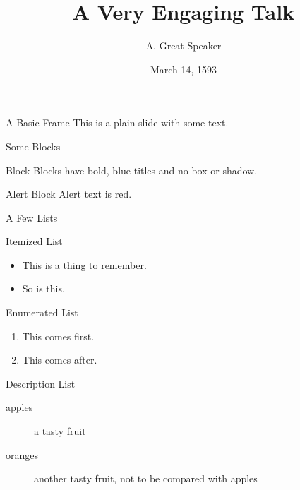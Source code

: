 \documentclass[presentation]{beamer}
\title{A Very Engaging Talk}
\author{A. Great Speaker}
\date{March 14, 1593}
\begin{document}
\begin{frame}
  \maketitle
\end{frame}

\begin{frame}{A Basic Frame}
  This is a plain slide with some text.
\end{frame}

\begin{frame}{Some Blocks}
  \begin{block}{Block}
    Blocks have bold, blue titles and no box or shadow.
  \end{block}
  \begin{alertblock}{Alert Block}
    Alert text is \alert{red}.
  \end{alertblock}
\end{frame}

\begin{frame}{A Few Lists}
  \begin{block}{Itemized List}
    \begin{itemize}
      \item This is a thing to remember.
      \item So is this.
    \end{itemize}
  \end{block}
  \begin{block}{Enumerated List}
    \begin{enumerate}
      \item This comes first.
      \item This comes after.
    \end{enumerate}
  \end{block}
  \begin{block}{Description List}
    \begin{description}
      \item[apples] a tasty fruit
      \item[oranges] another tasty fruit, not to be compared with apples
    \end{description}
  \end{block}
\end{frame}
\end{document}
